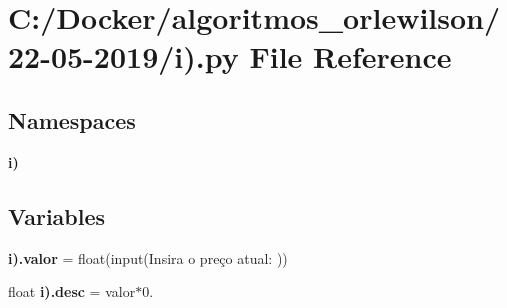 \section{C\+:/\+Docker/algoritmos\+\_\+orlewilson/22-\/05-\/2019/i).py File Reference}
\label{i_08_8py}
\subsection*{Namespaces}
\begin{DoxyCompactItemize}
\item 
 \textbf{ i)}
\end{DoxyCompactItemize}
\subsection*{Variables}
\begin{DoxyCompactItemize}
\item 
\textbf{ i).\+valor} = float(input(\textquotesingle{}Insira o preço atual\+: \textquotesingle{}))
\item 
float \textbf{ i).\+desc} = valor$\ast$0.
\end{DoxyCompactItemize}
